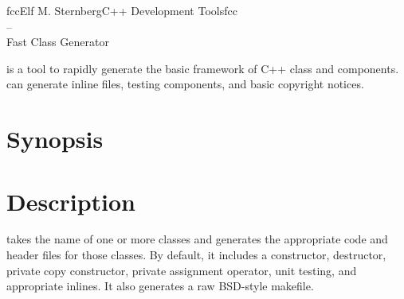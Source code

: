 \documentclass[english]{article}
\begin{document}
\begin{Name}{1}{fcc}{Elf M. Sternberg}{C++ Development Tools}{fcc\\--\\ Fast Class Generator}

   is a tool to rapidly generate the basic framework of C++
  class and components.   can generate inline files, testing 
  components, and basic copyright notices.

\end{Name}

\section{Synopsis}

 

\section{Description}
 takes the name of one or more classes and generates the
  appropriate code and header files for those classes.  By default, it
  includes a constructor, destructor, private copy constructor, private
  assignment operator, unit testing, and appropriate inlines.  It also
  generates a raw BSD-style makefile.
\end{document}
